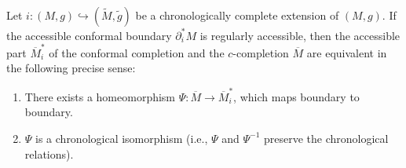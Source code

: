 \begin{theorem}\cite[Theorem 4.16]{Floresfinaldefinitioncausal2011} \label{thm:causaltoconformal} Let $i:(M,g) \hookrightarrow (\tilde{M},\tilde{g})$ be a chronologically complete extension of $(M,g)$. If the accessible conformal boundary $\partial_i^* M$ is regularly accessible, then the accessible part $\overline{M}_i^*$ of the conformal completion and the $c$-completion $\overline{M}$ are equivalent in the following precise sense:
\begin{enumerate}[label=(\roman*)]
  \item \label{thmcausaltoconformal-defPsi} There exists a homeomorphism $\Psi:\overline{M}\rightarrow \overline{M}_i^*$, which maps boundary to boundary.
  \item \label{thmcausaltoconformal-chrniso} $\Psi$ is a chronological isomorphism (i.e., $\Psi$ and $\Psi^{-1}$  preserve the chronological relations).
  \end{enumerate}
\end{theorem}





















